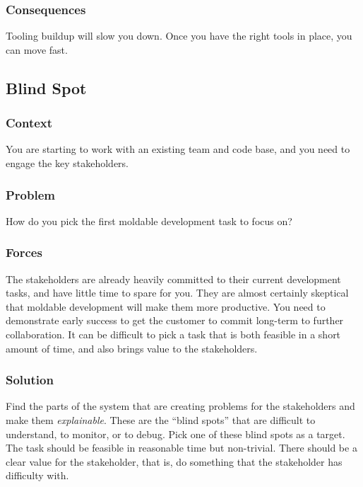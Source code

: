 \documentclass[sigconf]{acmart}
\renewcommand{\nbc}[3]{} %
\newcommand\eog[1]{\nbc{Edward}{#1}{purple}}
\begin{document}
\subsubsection*{Consequences}
Tooling buildup will slow you down.
Once you have the right tools in place, you can move fast.

\subsection*{Blind Spot}\label{pat:blindSpot}
\subsubsection*{Context}
You are starting to work with an existing team and code base, and you need to engage the key stakeholders.

\subsubsection*{Problem}
How do you pick the first moldable development task to focus on?

\subsubsection*{Forces}
The stakeholders are already heavily committed to their current development tasks, and have little time to spare for you.
They are almost certainly skeptical that moldable development will make them more productive.
You need to demonstrate early success to get the customer to commit long-term to further collaboration.
It can be difficult to pick a task that is both feasible in a short amount of time, and also brings value to the stakeholders.

\subsubsection*{Solution}
Find the parts of the system that are creating problems for the stakeholders and make them \emph{explainable}.
These are the ``blind spots'' that are difficult to understand, to monitor, or to debug.
Pick one of these blind spots as a target.
The task should be feasible in reasonable time but non-trivial.
There should be a clear value for the stakeholder, that is, do something that the stakeholder has difficulty with.

\eog{I really like this blind spot pattern. pointing out things that are difficult to understand modern debug. I almost want to like, say this is another like first place that we should talk about. You do that. I just wonder like should we like lift this further up in the paper or talk about it first?}
\end{document}
